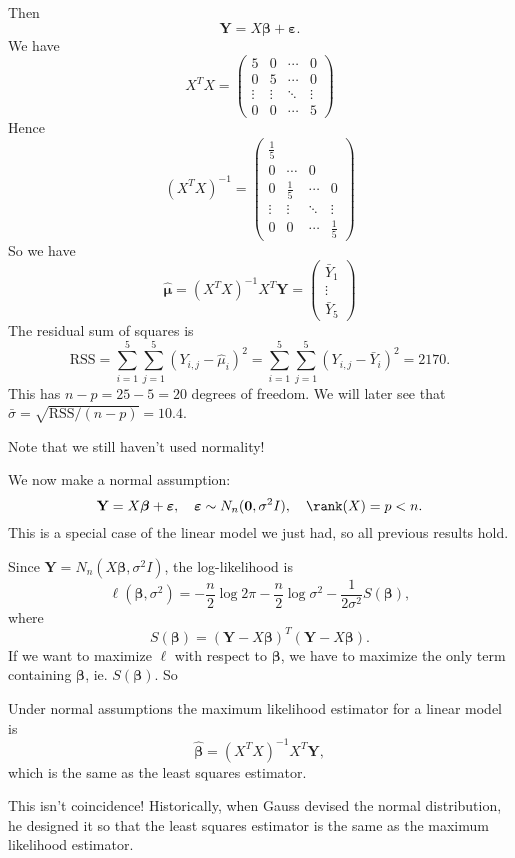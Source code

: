 \documentclass[a4paper]{article}
\begin{document}
\begin{eg}
\[  \]
  Then
  \[
    \mathbf{Y} = X\boldsymbol\beta + \boldsymbol\varepsilon.
  \]
  We have
  \[
    X^TX =
    \begin{pmatrix}
      5 & 0 & \cdots & 0\\
      0 & 5 & \cdots & 0\\
      \vdots & \vdots & \ddots & \vdots\\
      0 & 0 & \cdots & 5
    \end{pmatrix}
  \]
  Hence
  \[
    (X^TX)^{-1} =
    \begin{pmatrix}
      \frac{1}{5} \\ 0 & \cdots & 0\\
      0 & \frac{1}{5} & \cdots & 0\\
      \vdots & \vdots & \ddots & \vdots\\
      0 & 0 & \cdots & \frac{1}{5}
    \end{pmatrix}
  \]
  So we have
  \[
    \hat{\boldsymbol\mu} = (X^TX)^{-1}X^T\mathbf{Y} =
    \begin{pmatrix}
      \bar Y_1 \\\vdots\\ \bar Y_5
    \end{pmatrix}
  \]
  The residual sum of squares is
  \[
    \mathrm{RSS} = \sum_{i = 1}^5 \sum_{j = 1}^5 (Y_{i, j} - \hat{\mu}_i)^2 = \sum_{i = 1}^5 \sum_{j = 1}^5 (Y_{i, j} - \bar Y_i)^2 = 2170.
  \]
  This has $n - p = 25 - 5 = 20$ degrees of freedom. We will later see that $\bar \sigma = \sqrt{\mathrm{RSS}/(n - p)} = 10.4$.

  Note that we still haven't used normality!
\end{eg}

We now make a normal assumption:
\[
  \mathbf{Y} = X\boldsymbol\beta + \boldsymbol\varepsilon,\quad \boldsymbol\varepsilon\sim N_n(\mathbf{0}, \sigma^2 I),\quad \rank(X) = p < n.
\]
This is a special case of the linear model we just had, so all previous results hold.

Since $\mathbf{Y} = N_n(X\boldsymbol\beta, \sigma^2 I)$, the log-likelihood is
\[
  \ell(\boldsymbol\beta, \sigma^2) = -\frac{n}{2}\log 2\pi - \frac{n}{2}\log \sigma^2 - \frac{1}{2\sigma^2}S(\boldsymbol\beta),
\]
where
\[
  S(\boldsymbol\beta) = (\mathbf{Y} - X\boldsymbol\beta)^T(\mathbf{Y} - X\boldsymbol\beta).
\]
If we want to maximize $\ell$ with respect to $\boldsymbol\beta$, we have to maximize the only term containing $\boldsymbol\beta$, ie. $S(\boldsymbol\beta)$. So
\begin{prop}
  Under normal assumptions the maximum likelihood estimator for a linear model is
  \[
    \hat{\boldsymbol\beta} = (X^TX)^{-1}X^T\mathbf{Y},
  \]
  which is the same as the least squares estimator.
\end{prop}
This isn't coincidence! Historically, when Gauss devised the normal distribution, he designed it so that the least squares estimator is the same as the maximum likelihood estimator.
\end{document}
